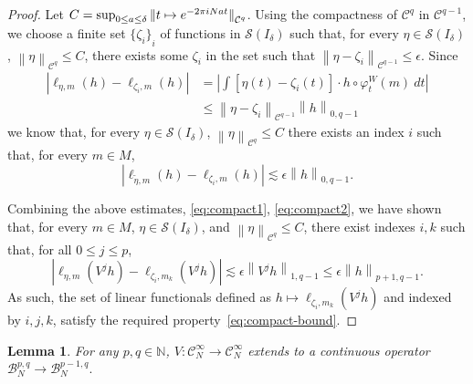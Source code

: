 \documentclass[a4paper,11pt]{amsart}
\newtheorem{lemma}[theorem]{Lemma}
\theoremstyle{remark}
\newcommand{\abs}[1]{\left|#1\right|} %
\newcommand{\cB}{\mathcal{B}} %
\newcommand{\cC}{\mathcal{C}} %
\newcommand{\cS}{\mathcal{S}} %
\newcommand{\bN}{\mathbb{N}} %
\newcommand{\norm}[1]{\left\|#1\right\|} %
\newcommand{\dv}{V} %
\newcommand{\dw}{W} %
\begin{document}
\begin{proof}
    Let \(C = \sup_{0 \leq a \leq \delta}\norm{\smash{t\mapsto e^{- 2\pi i N at}}}_{\cC^q}\).
    Using the compactness of \(\cC^{q}\) in \(\cC^{q-1}\), we choose a finite set \({\{\zeta_i\}}_{i}\) of functions in \(\cS(I_\delta)\) such that, for every \(\eta \in \cS(I_\delta)\), \(\norm{\eta}_{\cC^q} \leq C\), there exists some \(\zeta_i\) in the set such that \(\norm{\eta - \zeta_i}_{\cC^{q-1}}\leq \epsilon\).
    Since
    \[
        \begin{aligned}
            \abs{\ell_{\eta,m}(h) - \ell_{\zeta_i,m}(h)}
             & = \abs{\int \left[ \eta(t) - \zeta_i(t) \right] \cdot h\circ \varphi_{t}^{\dw}(m) \ dt  } \\
             & \leq  \norm{\eta - \zeta_i}_{\cC^{q-1}} \norm{h}_{0,q-1}
        \end{aligned}
    \]
    we know that, for every \(\eta \in \cS(I_\delta)\), \(\norm{\eta}_{\cC^q} \leq C\) there exists an index \(i\) such that, for every \(m \in M\),
    \begin{equation}
        \label{eq:compact2}
        \abs{\ell_{\tilde{\eta},m}(h) - \ell_{\zeta_i,m}(h)} \lesssim \epsilon \norm{h}_{0,q-1}.
    \end{equation}

    Combining the above estimates, \eqref{eq:compact1}, \eqref{eq:compact2}, we have shown that, for every \(m \in M\), \(\eta \in \cS(I_\delta)\), and \(\norm{\eta}_{\cC^q} \leq C\), there exist indexes \(i,k\) such that, for all  $0\leq j \leq p$,
    \[
        \abs{\ell_{\eta,m}(\dv^j h) - \ell_{\zeta_i,m_k}(\dv^j h)} \lesssim \epsilon \norm{\dv^j h}_{1,q-1} \leq  \epsilon \norm{h}_{p+1,q-1}.
    \]
    As such, the set of linear functionals defined as \(h \mapsto \ell_{\zeta_i,m_k}(\dv^j h)\) and indexed by \(i,j,k\), satisfy the required property~\eqref{eq:compact-bound}.
\end{proof}

\begin{lemma}
    \label{lem:cont-X}
    For any \(p,q \in \bN\), %
    \(\dv:\cC^{\infty}_N \rightarrow \cC^{\infty}_N\) extends to a continuous operator \(\cB_{N}^{p,q} \to \cB_{N}^{p-1,q}.\)
\end{lemma}
\end{document}
